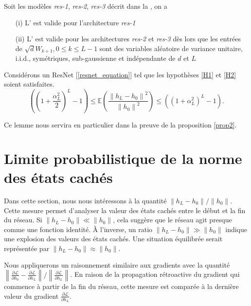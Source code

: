 \begin{proposition}[Admis]\label{prop1}
    Soit les modèles \textit{res-1}, \textit{res-2}, \textit{res-3} décrit dans la , on a \begin{itemize}
        \item [(i)] L' est valide pour l'architecture \textit{res-1}
        \item [(ii)] L' est valide pour les architectures \textit{res-2} et \textit{res-3} dès lors que les entrées de $ \sqrt{d}W_{k+1}, 0 \leq k \leq L-1 $ sont des variables aléatoire de variance unitaire, i.i.d., symétriques, sub-gaussienne et indépendante de $ d $ et $ L $
    \end{itemize}
\end{proposition}


\begin{lem}[Admis]\label{lem14}
    Considérons un ResNet [\ref{resnet_equation}] tel que les hypothèses \ref{H1} et \ref{H2} soient satisfaites.
    \[
        ((1 + \frac{\alpha _L ^2 }{2 }) ^L - 1) \leq \mathbb{E}( \frac{\left\| h_L - h_0 \right\| ^2 }{\left\| h_0 \right\| ^2}) \leq ((1 + \alpha _L ^2 ) ^L - 1 )
    .\]
\end{lem}
Ce lemme nous servira en particulier dans la preuve de la proposition \ref{prop2}.

\section{Limite probabilistique de la norme des états cachés}

Dans cette section, nous nous intéressons à la quantité $ {\left\| h_L - h_0 \right\|} / {\left\| h_0 \right\|}$. Cette mesure permet d'analyser la valeur des états cachés entre le début et la fin du réseau. Si $\left\| h_L - h_0 \right\| \ll \left\| h_0 \right\|$, cela suggère que le réseau agit presque comme une fonction identité. À l'inverse, un ratio $\left\| h_L - h_0 \right\| \gg \left\| h_0 \right\|$ indique une explosion des valeurs des états cachés. Une situation équilibrée serait représentée par $\left\| h_L - h_0 \right\| \approx \left\| h_0 \right\|$.

Nous appliquerons un raisonnement similaire aux gradients avec la quantité ${\left\| \frac{\partial \mathcal{L}}{\partial h_0} - \frac{\partial \mathcal{L}}{\partial h_L} \right\|} / {\left\| \frac{\partial \mathcal{L}}{\partial h_L} \right\|}$. En raison de la propagation rétroactive du gradient qui commence à partir de la fin du réseau, cette mesure est comparée à la dernière valeur du gradient $\frac{\partial \mathcal{L}}{\partial h_L}$.


